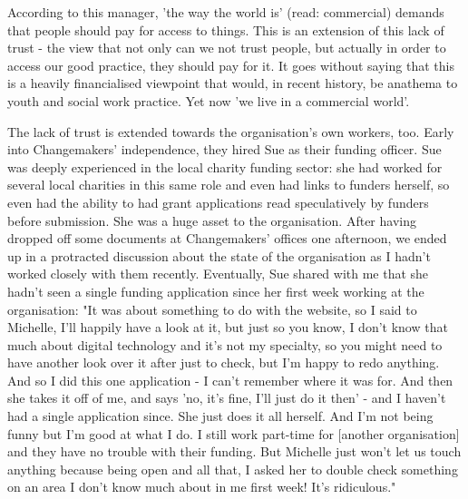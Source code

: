 According to this manager, 'the way the world is' (read: commercial) demands that people should pay for access to things. This is an extension of this lack of trust - the view that not only can we not trust people, but actually in order to access our good practice, they should pay for it. It goes without saying that this is a heavily financialised viewpoint that would, in recent history, be anathema to youth and social work practice. Yet now 'we live in a commercial world'.

The lack of trust is extended towards the organisation's own workers, too. Early into Changemakers' independence, they hired Sue as their funding officer. Sue was deeply experienced in the local charity funding sector: she had worked for several local charities in this same role and even had links to funders herself, so even had the ability to had grant applications read speculatively by funders before submission. She was a huge asset to the organisation. After having dropped off some documents at Changemakers' offices one afternoon, we ended up in a protracted discussion about the state of the organisation as I hadn't worked closely with them recently. Eventually, Sue shared with me that she hadn't seen a single funding application since her first week working at the organisation:
"It was about something to do with the website, so I said to Michelle, I'll happily have a look at it, but just so you know, I don't know that much about digital technology and it's not my specialty, so you might need to have another look over it after just to check, but I'm happy to redo anything. And so I did this one application - I can't remember where it was for. And then she takes it off of me, and says 'no, it's fine, I'll just do it then' - and I haven't had a single application since. She just does it all herself. And I'm not being funny but I'm good at what I do. I still work part-time for [another organisation] and they have no trouble with their funding. But Michelle just won't let us touch anything because being open and all that, I asked her to double check something on an area I don't know much about in me first week! It's ridiculous."

